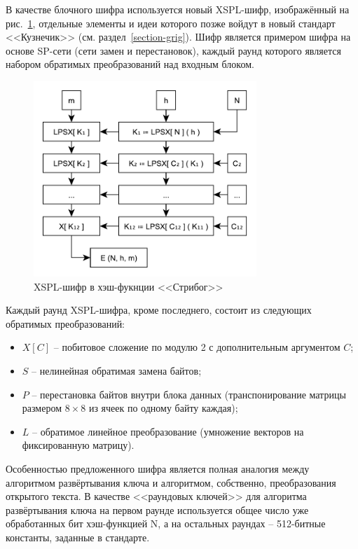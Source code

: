 В качестве блочного шифра используется новый XSPL-шифр, изображённый на рис.~\ref{fig:stribog-xspl}, отдельные элементы и идеи которого позже войдут в новый стандарт <<Кузнечик>> (см. раздел~\ref{section-grig}). Шифр является примером шифра на основе SP-сети (сети замен и перестановок), каждый раунд которого является набором обратимых преобразований над входным блоком.

\begin{figure}[htb]
	\centering
	\includegraphics[width=0.75\textwidth]{pic/stribog-xspl}
  \caption{XSPL-шифр в хэш-фукнции <<Стрибог>>}
  \label{fig:stribog-xspl}
\end{figure}

Каждый раунд XSPL-шифра, кроме последнего, состоит из следующих обратимых преобразований:
\begin{itemize}
	\item $X\left[C\right]$ -- побитовое сложение по модулю 2 с дополнительным аргументом $C$;
	\item $S$ -- нелинейная обратимая замена байтов;
	\item $P$ -- перестановка байтов внутри блока данных (транспонирование матрицы размером $8 \times 8$ из ячеек по одному байту каждая);
	\item $L$ -- обратимое линейное преобразование (умножение векторов на фиксированную матрицу).
\end{itemize}

Особенностью предложенного шифра является полная аналогия между алгоритмом развёртывания ключа и алгоритмом, собственно, преобразования открытого текста. В качестве <<раундовых ключей>> для алгоритма развёртывания ключа на первом раунде используется общее число уже обработанных бит хэш-функцией N, а на остальных раундах -- 512-битные константы, заданные в стандарте.

